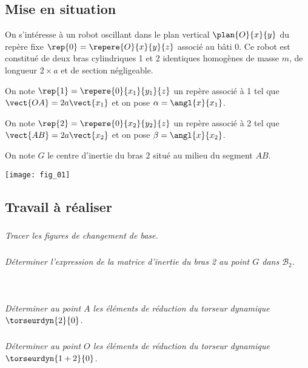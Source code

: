 \ifprof
\else
\begin{multicols}{2}
\fi

\subsection*{Mise en situation}
On s’intéresse à un robot oscillant dans le plan vertical $\plan{O}{x}{y}$ du repère fixe $\rep{0}=\repere{O}{x}{y}{z}$
associé au bâti 0.
Ce robot est constitué de deux bras cylindriques 1 et 2 identiques homogènes de masse $m$, de longueur
$2\times a$ et de section négligeable.

On note $\rep{1}=\repere{0}{x_1}{y_1}{z}$ un repère associé à 1 tel que $\vect{OA}=2a\vect{x_1}$ et on pose
$\alpha=\angl{x}{x_1}$. 

On note $\rep{2}=\repere{0}{x_2}{y_2}{z}$ un repère associé à 2 tel que $\vect{AB}=2a\vect{x_2}$ et on pose
$\beta=\angl{x}{x_2}$. 

On note $G$ le centre d’inertie du bras 2 situé au milieu du segment $AB$.

\begin{center}
\texttt{[image: fig\_01]}
\end{center}

\subsection*{Travail à réaliser}
\subparagraph{}
\textit{Tracer les figures de changement de base.}
\ifprof
\begin{corrige}
\end{corrige}
\else
\fi
\subparagraph{}
\textit{Déterminer l'expression de la matrice d'inertie du bras 2 au point $G$ dans $\mathcal{B}_2$.}
\ifprof
\begin{corrige}
~\\
\end{corrige}
\else
\fi



\subparagraph{}
\textit{Déterminer au point $A$ les éléments de réduction du torseur dynamique $\torseurdyn{2}{0}$.}
\ifprof
\begin{corrige}
\end{corrige}
\else
\fi

\subparagraph{}
\textit{Déterminer au point $O$ les éléments de réduction du torseur dynamique $\torseurdyn{1+2}{0}$.}
\ifprof
\begin{corrige}
\end{corrige}
\else
\fi




\end{multicols}
